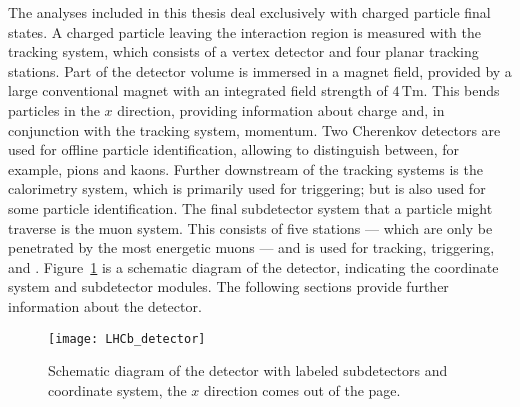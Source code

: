 
The analyses included in this thesis deal exclusively with charged particle final states.
A charged particle leaving the interaction region is measured with the tracking system, which
consists of a vertex detector and four planar tracking stations.
Part of the detector volume is immersed in a magnet field, provided by a large conventional magnet
with an integrated field strength of $4\,\mathrm{Tm}$.
This bends particles in the $x$ direction, providing information about charge and, in conjunction
with the tracking system, momentum.
Two Cherenkov detectors are used for offline particle identification, allowing \lhcb to distinguish
between, for example, pions and kaons.
Further downstream of the tracking systems is the calorimetry system, which is primarily used for
triggering; but is also used for some particle identification.
The final subdetector system that a particle might traverse is the muon system.
This consists of five stations --- which are only be penetrated by the most energetic muons --- and
is used for tracking, triggering, and \pid.
Figure~\ref{fig:lhcb:lhcb} is a schematic diagram of the \lhcb detector, indicating the coordinate
system and subdetector modules.
The following sections provide further information about the \lhcb detector.


\begin{figure}
  \begin{center}
    \texttt{[image: LHCb\_detector]}
  \end{center}
  \caption[Diagram of the LHCb detector]
  {\small
    Schematic diagram of the \lhcb detector with labeled subdetectors and coordinate system, the
    $x$ direction comes out of the page.
  }
  \label{fig:lhcb:lhcb}
\end{figure}


